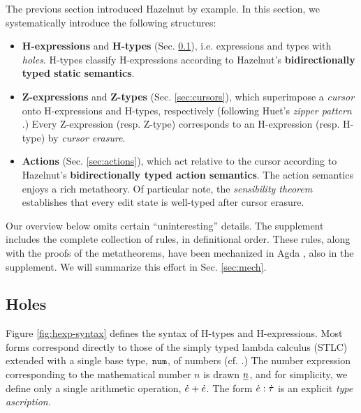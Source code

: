 
The previous section introduced Hazelnut by example. In this section, we systematically introduce the following  structures:
\begin{itemize}[itemsep=0px,partopsep=2px,topsep=2px]
\item \textbf{H-expressions} and \textbf{H-types} (Sec. \ref{sec:holes}), i.e. expressions and types with \emph{holes}. H-types classify H-expressions according to Hazelnut's \textbf{bidirectionally typed static semantics}.
\item \textbf{Z-expressions} and \textbf{Z-types} (Sec. \ref{sec:cursors}), which superimpose\- a \emph{cursor} onto H-expressions and H-types, respectively (following Huet's \emph{zipper pattern} \cite{JFP::Huet1997}.) Every Z-expression (resp. Z-type) corresponds to an H-expression (resp. H-type) by \emph{cursor erasure}.
\item \textbf{Actions} (Sec. \ref{sec:actions}), which act relative to the cursor according to Hazelnut's \textbf{bidirectionally typed action semantics}. The action semantics enjoys a rich metatheory. Of particular note, the \emph{sensibility theorem} establishes that every edit state is well-typed after cursor erasure.
\end{itemize}

Our overview below omits certain ``uninteresting'' details. The supplement includes the complete collection of rules, in definitional order. These rules, along with the proofs of the metatheorems, have been mechanized in Agda \cite{norell:thesis}, also in the supplement. We will summarize this effort in Sec. \ref{sec:mech}.%

\subsection{Holes}\label{sec:holes}


Figure \ref{fig:hexp-syntax} defines the syntax of H-types and H-expressions. Most forms correspond directly to those of the simply typed lambda calculus (STLC) extended with a single base type, $\texttt{num}$, of numbers (cf. \cite{pfpl}.) The number expression corresponding to the mathematical number $n$ is drawn $\underline{n}$, and for simplicity, we define only a single arithmetic operation, $\dot{e} + \dot{e}$. The form $\dot{e} : \dot{\tau}$ is an explicit \emph{type ascription}. 

